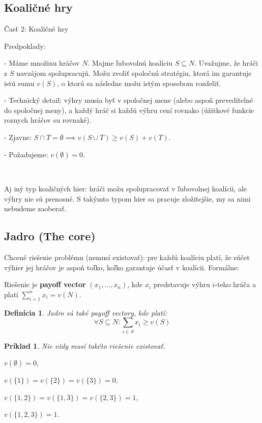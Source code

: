 \documentclass[a5paper,12pt]{article}
\newtheorem*{mydef}{Defin\'icia}
\newtheorem*{exampl}{Pr\'iklad}
\begin{document}
    \subsection{Koali\v{c}n\'e hry}
      \v{C}as\v{t} 2: Koali\v{c}n\'e hry

      Predpoklady:

      - M\'ame mno\v{z}inu hr\'a\v{c}ov $N$. Majme \v{l}ubovoln\'u koal\'iciu $S \subseteq N$. Uva\v{z}ujme, \v{z}e hr\'a\v{c}i z $S$ navz\'ajom spolupracuj\'u. Mo\v{z}u zvoli\v{t} spolo\v{c}n\'u strat\'egiu, ktor\'a im garantuje ist\'u sumu $v(S)$, o ktor\'u sa n\'asledne mo\v{z}u ist\'ym sposobom rozdeli\v{t}. 

      - Technick\'y detail: v\'yhry musia by\v{t} v spolo\v{c}nej mene (alebo aspo\v{n} prevediteln\'e do spolo\v{c}nej meny), a ka\v{z}d\'y hr\'a\v{c} si ka\v{z}d\'u v\'yhru cen\'i rovnako (\'u\v{z}itkov\'e funkcie roznych hr\'a\v{c}ov su rovnak\'e).

      - Zjavne: $S \cap T = \emptyset \implies v(S \cup T) \geq v(S) + v(T)$.

      - Po\v{z}adujeme: $v(\emptyset)=0$.

      \

      Aj in\'y typ koali\v{c}n\'ych hier: hr\'a\v{c}i mo\v{z}u spolupracova\v{t} v \v{l}ubovolnej koal\'icii, ale v\'yhry nie s\'u prenosn\'e. S tak\'ymto typom hier sa pracuje zlo\v{z}itej\v{s}ie, my sa nimi nebudeme zaobera\v{t}.
      
    \subsection{Jadro (The core)}
      Chcen\'e rie\v{s}enie probl\'emu (nemus\'i existova\v{t}): pre ka\v{z}d\'u koal\'iciu plat\'i, \v{z}e s\'u\v{c}et v\'yhier jej hr\'a\v{c}ov je aspo\v{n} to\v{l}ko, ko\v{l}ko garantuje \'u\v{c}as\v{t} v koal\'icii. Form\'alne:

      Rie\v{s}enie je {\bf payoff vector} $(x_{1}, ..., x_{n})$, kde $x_{i}$ predstavuje v\'yhru $i$-teho hr\'a\v{c}a a plat\'i $\sum_{i=1}^{n} x_{i} = v(N)$.

      \begin{mydef}
      Jadro s\'u tak\'e payoff vectory, kde plat\'i:
      \[\forall S \subseteq N: \sum_{i \in S}x_{i} \geq v(S)\]
      \end{mydef}
      \begin{exampl} Nie v\v{z}dy mus\'i tak\'eto rie\v{s}enie existova\v{t}. 

      $v(\emptyset)=0,$

      $ v(\{1\})=v(\{2\})=v(\{3\})=0,$

      $v(\{1,2\})=v(\{1,3\})=v(\{2,3\})=1, $

      $v(\{1,2,3\})=1$.

      \end{exampl}
\end{document}
